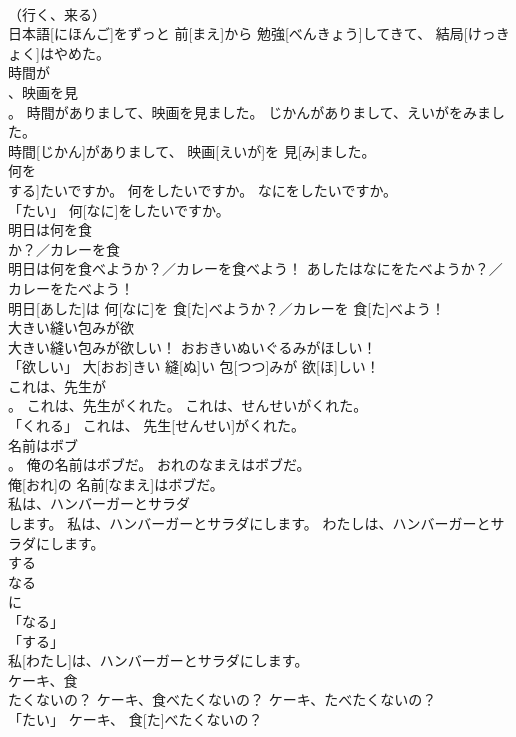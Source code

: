 \documentclass[8pt]{extreport}
\begin{document}
\begin{CJK}{UTF8}{min}
\\	（行く、来る） 
\\	日本語[にほんご]をずっと 前[まえ]から 勉強[べんきょう]してきて、 結局[けっきょく]はやめた。		
\\	時間が
\\	、映画を見
\\	。	時間がありまして、映画を見ました。	じかんがありまして、えいがをみました。	
\\	時間[じかん]がありまして、 映画[えいが]を 見[み]ました。		
\\	何を
\\	する]たいですか。	何をしたいですか。	なにをしたいですか。	
\\	「たい」	何[なに]をしたいですか。		
\\	明日は何を食
\\	か？／カレーを食
\\	明日は何を食べようか？／カレーを食べよう！	あしたはなにをたべようか？／カレーをたべよう！	
\\	明日[あした]は 何[なに]を 食[た]べようか？／カレーを 食[た]べよう！		
\\	大きい縫い包みが欲
\\	大きい縫い包みが欲しい！	おおきいぬいぐるみがほしい！	
\\	「欲しい」	大[おお]きい 縫[ぬ]い 包[つつ]みが 欲[ほ]しい！		
\\	これは、先生が
\\	。	これは、先生がくれた。	これは、せんせいがくれた。	
\\	「くれる」	これは、 先生[せんせい]がくれた。		
\\	名前はボブ
\\	。	俺の名前はボブだ。	おれのなまえはボブだ。	
\\	俺[おれ]の 名前[なまえ]はボブだ。		
\\	私は、ハンバーガーとサラダ
\\	します。	私は、ハンバーガーとサラダにします。	わたしは、ハンバーガーとサラダにします。	
\\	する 
\\	なる 
\\	に 
\\	「なる」 
\\	「する」 
\\	私[わたし]は、ハンバーガーとサラダにします。		
\\	ケーキ、食
\\	たくないの？	ケーキ、食べたくないの？	ケーキ、たべたくないの？	
\\	「たい」	ケーキ、 食[た]べたくないの？		

\end{CJK}
\end{document}
